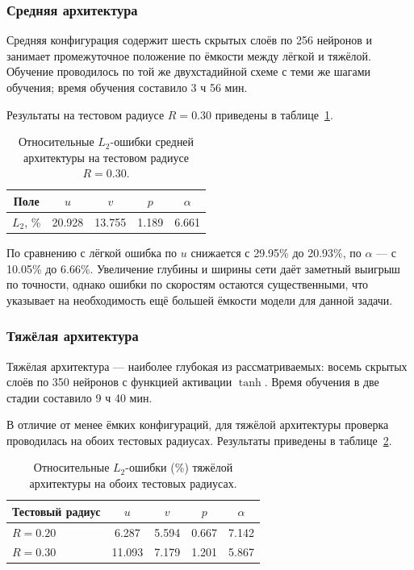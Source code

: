 \documentclass[12pt,a4paper]{article}
\begin{document}
\subsubsection{Средняя архитектура}

Средняя конфигурация содержит шесть скрытых слоёв по 256 нейронов и занимает
промежуточное положение по ёмкости между лёгкой и тяжёлой. Обучение проводилось
по той же двухстадийной схеме с теми же шагами обучения; время обучения
составило 3 ч 56 мин.

Результаты на тестовом радиусе \(R=0.30\) приведены в
таблице~\ref{tab:medium_errors}.

\begin{table}[H]
    \centering
    \begin{tabular}{c|cccc}
        \hline
        Поле & \(u\) & \(v\) & \(p\) & \(\alpha\) \\
        \hline
        \(L_2\), \% & 20.928 & 13.755 & 1.189 & 6.661 \\
        \hline
    \end{tabular}
    \caption{Относительные \(L_2\)-ошибки средней архитектуры на тестовом радиусе \(R=0.30\).}
    \label{tab:medium_errors}
\end{table}

По сравнению с лёгкой ошибка по \(u\) снижается с 29.95\% до 20.93\%, по
\(\alpha\) --- с 10.05\% до 6.66\%. Увеличение глубины и ширины сети даёт
заметный выигрыш по точности, однако ошибки по скоростям остаются
существенными, что указывает на необходимость ещё большей ёмкости модели
для данной задачи.

\subsubsection{Тяжёлая архитектура}

Тяжёлая архитектура --- наиболее глубокая из рассматриваемых: восемь скрытых
слоёв по 350 нейронов с функцией активации \(\tanh\). Время обучения в две
стадии составило 9 ч 40 мин.

В отличие от менее ёмких конфигураций, для тяжёлой архитектуры проверка
проводилась на обоих тестовых радиусах. Результаты приведены в
таблице~\ref{tab:hard_errors}.

\begin{table}[H]
    \centering
    \begin{tabular}{l|cccc}
        \hline
        Тестовый радиус & \(u\) & \(v\) & \(p\) & \(\alpha\) \\
        \hline
        \(R=0.20\) & 6.287 & 5.594 & 0.667 & 7.142 \\
        \(R=0.30\) & 11.093 & 7.179 & 1.201 & 5.867 \\
        \hline
    \end{tabular}
    \caption{Относительные \(L_2\)-ошибки (\%) тяжёлой архитектуры на обоих тестовых радиусах.}
    \label{tab:hard_errors}
\end{table}
\end{document}
